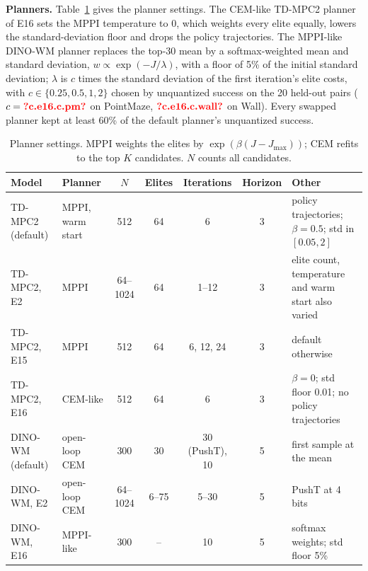 \textbf{Planners.} Table~\ref{tab:planners} gives the planner settings. The CEM-like TD-MPC2 planner of E16 sets the MPPI temperature to 0, which weights every elite equally, lowers the standard-deviation floor and drops the policy trajectories. The MPPI-like DINO-WM planner replaces the top-30 mean by a softmax-weighted mean and standard deviation, $w\propto\exp(-J/\lambda)$, with a floor of 5\% of the initial standard deviation; $\lambda$ is $c$ times the standard deviation of the first iteration's elite costs, with $c\in\{0.25, 0.5, 1, 2\}$ chosen by unquantized success on the 20 held-out pairs ($c=\nv{c.e16.c.pm}$ on PointMaze, $\nv{c.e16.c.wall}$ on Wall). Every swapped planner kept at least 60\% of the default planner's unquantized success.

\begin{table}[h]
\caption{Planner settings. MPPI weights the elites by $\exp(\beta(J-J_{\max}))$; CEM refits to the top $K$ candidates. $N$ counts all candidates.}
\label{tab:planners}
\centering\footnotesize
\setlength{\tabcolsep}{3.5pt}
\begin{tabular}{@{}l>{\raggedright}p{2.4cm}cccc>{\raggedright\arraybackslash}p{4.2cm}@{}}
\toprule
Model & Planner & $N$ & Elites & Iterations & Horizon & Other \\
\midrule
TD-MPC2 (default) & MPPI, warm start & 512 & 64 & 6 & 3 & 24 policy trajectories; $\beta=0.5$; std in $[0.05, 2]$ \\
TD-MPC2, E2 & MPPI & 64--1024 & 64 & 1--12 & 3 & elite count, temperature and warm start also varied \\
TD-MPC2, E15 & MPPI & 512 & 64 & 6, 12, 24 & 3 & default otherwise \\
TD-MPC2, E16 & CEM-like & 512 & 64 & 6 & 3 & $\beta=0$; std floor 0.01; no policy trajectories \\
DINO-WM (default) & open-loop CEM & 300 & 30 & 30 (PushT), 10 & 5 & first sample at the mean \\
DINO-WM, E2 & open-loop CEM & 64--1024 & 6--75 & 5--30 & 5 & PushT at 4 bits \\
DINO-WM, E16 & MPPI-like & 300 & -- & 10 & 5 & softmax weights; std floor 5\% \\
\bottomrule
\end{tabular}
\end{table}

